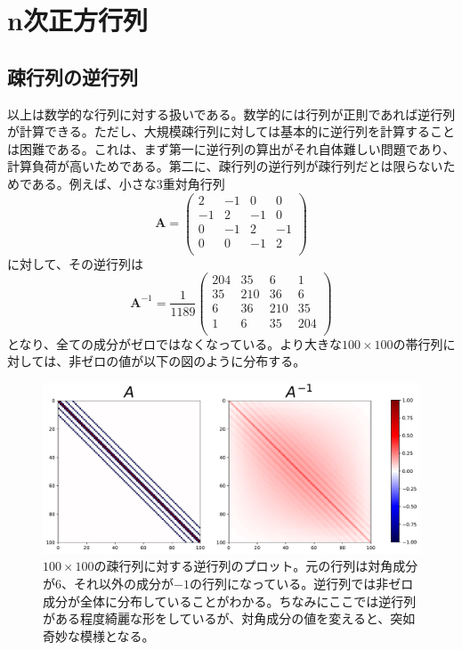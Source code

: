 \section{n次正方行列}
\subsection{疎行列の逆行列}
以上は数学的な行列に対する扱いである。数学的には行列が正則であれば逆行列が計算できる。ただし、大規模疎行列に対しては基本的に逆行列を計算することは困難である。これは、まず第一に逆行列の算出がそれ自体難しい問題であり、計算負荷が高いためである。第二に、疎行列の逆行列が疎行列だとは限らないためである。例えば、小さな3重対角行列
\begin{equation}
	\boldsymbol{A}=
	\begin{pmatrix}
		2  & -1 & 0  & 0  \\
		-1 & 2  & -1 & 0  \\
		0  & -1 & 2  & -1 \\
		0  & 0  & -1 & 2  \\
	\end{pmatrix}
\end{equation}
に対して、その逆行列は
\begin{equation}
	\boldsymbol{A}^{-1}= \frac{1}{1189}
	\begin{pmatrix}
		204 & 35  & 6   & 1   \\
		35  & 210 & 36  & 6   \\
		6   & 36  & 210 & 35  \\
		1   & 6   & 35  & 204 \\
	\end{pmatrix}
\end{equation}
となり、全ての成分がゼロではなくなっている。より大きな\(100\times 100\)の帯行列に対しては、非ゼロの値が以下の図のように分布する。
\begin{figure}[H]
	\centering
	\includegraphics[width=0.8\hsize]{img/mathematical_sparsematrix.pdf}
	\caption{\(100\times 100\)の疎行列に対する逆行列のプロット。元の行列は対角成分が\(6\)、それ以外の成分が\(-1\)の行列になっている。逆行列では非ゼロ成分が全体に分布していることがわかる。ちなみにここでは逆行列がある程度綺麗な形をしているが、対角成分の値を変えると、突如奇妙な模様となる。}
	\label{fig:Math_spMat}
\end{figure}
